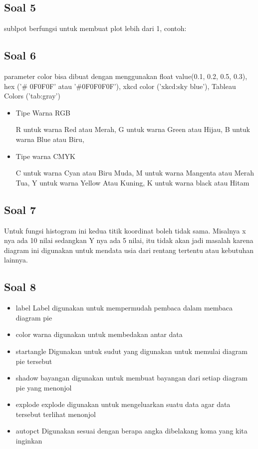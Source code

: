 \subsection{Soal 5}
sublpot berfungsi untuk membuat plot lebih dari 1, contoh:


\subsection{Soal 6}
parameter color bisa dibuat dengan menggunakan float value(0.1, 0.2, 0.5, 0.3), hex ('\# 0F0F0F' atau '\#0F0F0F0F'), xkcd color ('xkcd:sky blue'), Tableau Colors ('tab:gray')
\begin{itemize}
    \item Tipe Warna RGB

    R untuk warna Red atau Merah,
    G untuk warna Green atau Hijau,
    B untuk warna Blue atau Biru,
    \item Tipe warna CMYK

    C untuk warna Cyan atau Biru Muda,
    M untuk warna Mangenta atau Merah Tua,
    Y untuk warna Yellow Atau Kuning,
    K untuk warna black atau Hitam
\end{itemize}


\subsection{Soal 7}
Untuk fungsi histogram ini kedua titik koordinat boleh tidak sama. Misalnya x nya ada 10 nilai sedangkan Y nya ada 5 nilai, itu tidak akan jadi masalah karena diagram ini digunakan untuk mendata usia dari rentang tertentu atau kebutuhan lainnya.
	

\subsection{Soal 8}
\begin{itemize}
    \item label
    Label digunakan untuk mempermudah pembaca dalam membaca diagram pie
    \item color
    warna digunakan untuk membedakan antar data
    \item startangle
    Digunakan untuk sudut yang digunakan untuk memulai diagram pie tersebut
    \item shadow
    bayangan digunakan untuk membuat bayangan dari setiap diagram pie yang menonjol
    \item explode
    explode digunakan untuk mengeluarkan suatu data agar data tersebut terlihat menonjol
    \item autopct
    Digunakan sesuai dengan berapa angka dibelakang koma yang kita inginkan
\end{itemize}

